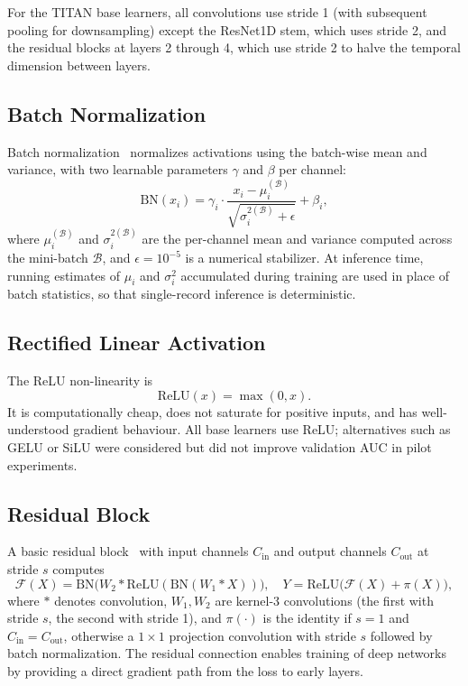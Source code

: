 For the TITAN base learners, all convolutions use stride 1 (with subsequent pooling for downsampling) except the ResNet1D stem, which uses stride 2, and the residual blocks at layers 2 through 4, which use stride 2 to halve the temporal dimension between layers.

\subsection{Batch Normalization}

Batch normalization~\cite{ioffe2015batch} normalizes activations using the batch-wise mean and variance, with two learnable parameters $\gamma$ and $\beta$ per channel:
\begin{equation}
\mathrm{BN}(x_{i}) = \gamma_i \cdot \frac{x_i - \mu_i^{(\mathcal{B})}}{\sqrt{\sigma_i^{2(\mathcal{B})} + \epsilon}} + \beta_i,
\end{equation}
where $\mu_i^{(\mathcal{B})}$ and $\sigma_i^{2(\mathcal{B})}$ are the per-channel mean and variance computed across the mini-batch $\mathcal{B}$, and $\epsilon = 10^{-5}$ is a numerical stabilizer. At inference time, running estimates of $\mu_i$ and $\sigma_i^2$ accumulated during training are used in place of batch statistics, so that single-record inference is deterministic.

\subsection{Rectified Linear Activation}

The ReLU non-linearity is
\begin{equation}
\mathrm{ReLU}(x) = \max(0, x).
\end{equation}
It is computationally cheap, does not saturate for positive inputs, and has well-understood gradient behaviour. All base learners use ReLU; alternatives such as GELU or SiLU were considered but did not improve validation AUC in pilot experiments.

\subsection{Residual Block}

A basic residual block~\cite{he2016deep} with input channels $C_{\mathrm{in}}$ and output channels $C_{\mathrm{out}}$ at stride $s$ computes
\begin{equation}
\mathcal{F}(X) = \mathrm{BN}\bigl(W_2 * \mathrm{ReLU}(\mathrm{BN}(W_1 * X))\bigr), \quad Y = \mathrm{ReLU}\bigl(\mathcal{F}(X) + \pi(X)\bigr),
\end{equation}
where $*$ denotes convolution, $W_1, W_2$ are kernel-3 convolutions (the first with stride $s$, the second with stride 1), and $\pi(\cdot)$ is the identity if $s=1$ and $C_{\mathrm{in}}=C_{\mathrm{out}}$, otherwise a $1\times 1$ projection convolution with stride $s$ followed by batch normalization. The residual connection enables training of deep networks by providing a direct gradient path from the loss to early layers.

